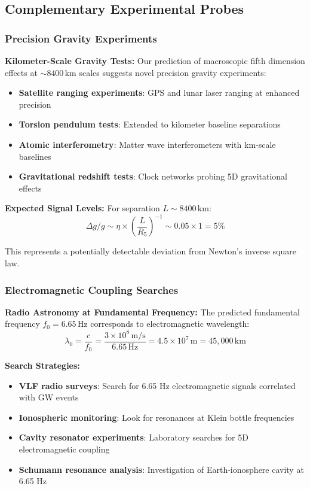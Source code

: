 \documentclass[reprint,amsmath,amssymb,aps,prd]{revtex4-2}
\newcommand{\Hz}{\,\text{Hz}}
\newcommand{\km}{\,\text{km}}
\begin{document}
\subsection{Complementary Experimental Probes}

\subsubsection{Precision Gravity Experiments}

\textbf{Kilometer-Scale Gravity Tests:}
Our prediction of macroscopic fifth dimension effects at $\sim 8400\km$ scales suggests novel precision gravity experiments:

\begin{itemize}
\item \textbf{Satellite ranging experiments}: GPS and lunar laser ranging at enhanced precision
\item \textbf{Torsion pendulum tests}: Extended to kilometer baseline separations
\item \textbf{Atomic interferometry}: Matter wave interferometers with km-scale baselines
\item \textbf{Gravitational redshift tests}: Clock networks probing 5D gravitational effects
\end{itemize}

\textbf{Expected Signal Levels:}
For separation $L \sim 8400\km$:
\begin{equation}
\Delta g / g \sim \eta \times \left(\frac{L}{R_5}\right)^{-1} \sim 0.05 \times 1 = 5\%
\end{equation}

This represents a potentially detectable deviation from Newton's inverse square law.

\subsubsection{Electromagnetic Coupling Searches}

\textbf{Radio Astronomy at Fundamental Frequency:}
The predicted fundamental frequency $f_0 = 6.65\Hz$ corresponds to electromagnetic wavelength:
\begin{equation}
\lambda_0 = \frac{c}{f_0} = \frac{3 \times 10^8\,\text{m/s}}{6.65\,\text{Hz}} = 4.5 \times 10^7\,\text{m} = 45,000\,\text{km}
\end{equation}

\textbf{Search Strategies:}
\begin{itemize}
\item \textbf{VLF radio surveys}: Search for 6.65 Hz electromagnetic signals correlated with GW events
\item \textbf{Ionospheric monitoring}: Look for resonances at Klein bottle frequencies
\item \textbf{Cavity resonator experiments}: Laboratory searches for 5D electromagnetic coupling
\item \textbf{Schumann resonance analysis}: Investigation of Earth-ionosphere cavity at 6.65 Hz
\end{itemize}
\end{document}
